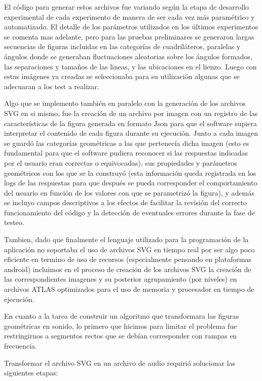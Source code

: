 \documentclass{article}
\begin{document}
    El código para generar estos archivos fue variando según la etapa de desarrollo experimental de cada experimento de manera de ser cada vez más paramétrico y automatizado. El detalle de los parámetros utilizados en los últimos experimentos se comenta mas adelante, pero para las pruebas preliminares se generaron largas secuencias de figuras incluidas en las categorías de cuadriláteros, paralelas y ángulos donde se generaban fluctuaciones aleatorias sobre los ángulos formados, las separaciones y tamaños de las lineas, y las ubicaciones en el lienzo. Luego con estas imágenes ya creadas se seleccionaba para su utilización algunas que se adecuaran a los test a realizar.
    
    Algo que se implemento también en paralelo con la generación de los archivos SVG en si mismo, fue la creación de un archivo por imagen con un registro de las características de la figura generada en formato Json para que el software supiera interpretar el contenido de cada figura durante su ejecución. Junto a cada imagen se guardó las categorías geométricas a las que pertenecía dicha imagen (esto es fundamental para que el software pudiera reconocer si las respuestas indicadas por el usuario eran correctas o equivocadas), sus propiedades y parámetros geométricos con los que se la construyó (esta información queda registrada en los logs de las respuestas para que después se pueda corresponder el comportamiento del usuario en función de los valores con que se parametrizó la figura), y además se incluyo campos descriptivos a los efectos de facilitar la revisión del correcto funcionamiento del código y la detección de eventuales errores durante la fase de testeo. 
    
    Tambien, dado que finalmente el lenguaje utilizado para la programación de la aplicación no soportaba el uso de archivos SVG en tiempo real por ser algo poco eficiente en termino de uso de recursos (especialmente pensando en plataformas android) incluimos en el proceso de creación de los archivos SVG la creación de las correspondientes imagenes y su posterior agrupamiento (por niveles) en archivos ATLAS optimizados para el uso de memoria y procesador en tiempo de ejecución.
    
    En cuanto a la tarea de construir un algoritmo que transformara las figuras geométricas en sonido, lo primero que hicimos para limitar el problema fue restringirnos a segmentos rectos que se debían corresponder con rampas en frecuencia.
    
    Transformar el archivo SVG en un archivo de audio requirió solucionar las siguientes etapas:
    
\end{document}
